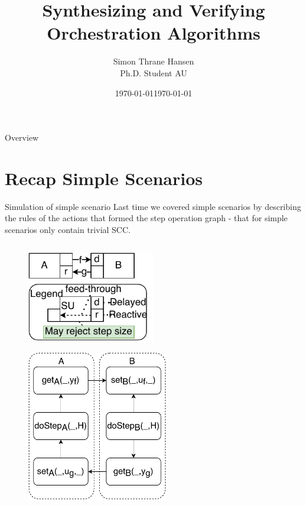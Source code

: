 \documentclass{beamer}
\title[Synthesizing Co-Simulation Algorithms] %
{Synthesizing and Verifying Orchestration Algorithms}
\date{\today}
\author[Thrane, S.] %
{Simon Thrane Hansen \\ Ph.D. Student AU}
\date[AU 2021] %
{\today}
\begin{document}
\frame{\titlepage}

\begin{frame}{Overview}
    \tableofcontents
\end{frame}

\section{Recap Simple Scenarios}
\begin{frame}{Simulation of simple scenario}
    Last time we covered simple scenarios by describing the rules of the actions that formed the step operation graph - that for simple scenarios only contain trivial SCC.
    \begin{columns}[T] %
        \begin{column}{.48\textwidth}
            \begin{figure}    
                \includegraphics[width=0.5\textwidth]{images/simple_example.pdf}
            \end{figure}
            \begin{figure}
                \centering
                \includegraphics[width=0.55\textwidth]{images/simple_scenario_graph.pdf}
            \end{figure}
    \end{column}%

\end{columns}
\end{frame}
\end{document}
